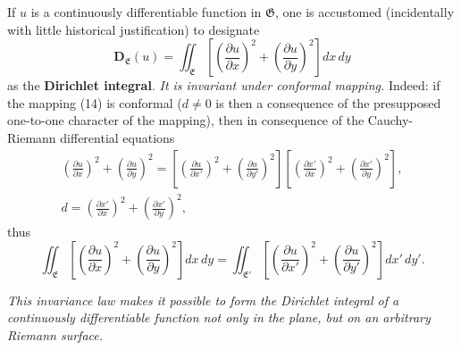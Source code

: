 \documentclass{article}
\begin{document}
If $u$ is a continuously differentiable function in $\mathfrak{G}$, one is accustomed (incidentally with little historical justification) to designate
\[ \mathbf{D}_{\mathfrak{E}}(u) = \iint_{\mathfrak{E}} \left[ \left(\frac{\partial u}{\partial x}\right)^2 + \left(\frac{\partial u}{\partial y}\right)^2 \right] dx\,dy \]
as the \textbf{Dirichlet integral}. \emph{It is invariant under conformal mapping.} Indeed: if the mapping (14) is conformal ($d \neq 0$ is then a consequence of the presupposed one-to-one character of the mapping), then in consequence of the Cauchy-Riemann differential equations
\[ \begin{gathered}
\left(\frac{\partial u}{\partial x}\right)^2 + \left(\frac{\partial u}{\partial y}\right)^2 = \left[ \left(\frac{\partial u}{\partial x'}\right)^2 + \left(\frac{\partial u}{\partial y'}\right)^2 \right] \left[ \left(\frac{\partial x'}{\partial x}\right)^2 + \left(\frac{\partial x'}{\partial y}\right)^2 \right], \\
d = \left(\frac{\partial x'}{\partial x}\right)^2 + \left(\frac{\partial x'}{\partial y}\right)^2,
\end{gathered} \]
thus
\[ \iint_{\mathfrak{E}} \left[ \left(\frac{\partial u}{\partial x}\right)^2 + \left(\frac{\partial u}{\partial y}\right)^2 \right] dx\,dy = \iint_{\mathfrak{E}'} \left[ \left(\frac{\partial u}{\partial x'}\right)^2 + \left(\frac{\partial u}{\partial y'}\right)^2 \right] dx'\,dy'. \]

\emph{This invariance law makes it possible to form the Dirichlet integral of a continuously differentiable function not only in the plane, but on an arbitrary Riemann surface.}
\end{document}
